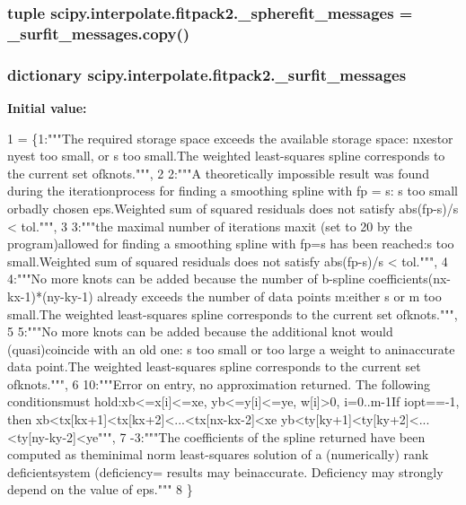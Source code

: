 \subsubsection[{\+\_\+spherefit\+\_\+messages}]{\setlength{\rightskip}{0pt plus 5cm}tuple scipy.\+interpolate.\+fitpack2.\+\_\+spherefit\+\_\+messages = \+\_\+surfit\+\_\+messages.\+copy()}\label{namespacescipy_1_1interpolate_1_1fitpack2_a7b9b6ca290bc4a32d87bcbedf98701c6}
\hypertarget{namespacescipy_1_1interpolate_1_1fitpack2_ab197deef0ee75808b311245ee95464b9}{}
\subsubsection[{\+\_\+surfit\+\_\+messages}]{\setlength{\rightskip}{0pt plus 5cm}dictionary scipy.\+interpolate.\+fitpack2.\+\_\+surfit\+\_\+messages}\label{namespacescipy_1_1interpolate_1_1fitpack2_ab197deef0ee75808b311245ee95464b9}
{\bfseries Initial value\+:}
\begin{DoxyCode}
1 = \{1:\textcolor{stringliteral}{"""The required storage space exceeds the available storage space: nxestor nyest too small, or s too
       small.The weighted least-squares spline corresponds to the current set ofknots."""},
2                     2:\textcolor{stringliteral}{"""A theoretically impossible result was found during the iterationprocess for
       finding a smoothing spline with fp = s: s too small orbadly chosen eps.Weighted sum of squared residuals does not
       satisfy abs(fp-s)/s < tol."""},
3                     3:\textcolor{stringliteral}{"""the maximal number of iterations maxit (set to 20 by the program)allowed for
       finding a smoothing spline with fp=s has been reached:s too small.Weighted sum of squared residuals does not
       satisfy abs(fp-s)/s < tol."""},
4                     4:\textcolor{stringliteral}{"""No more knots can be added because the number of b-spline
       coefficients(nx-kx-1)*(ny-ky-1) already exceeds the number of data points m:either s or m too small.The weighted least-squares
       spline corresponds to the current set ofknots."""},
5                     5:\textcolor{stringliteral}{"""No more knots can be added because the additional knot would (quasi)coincide with
       an old one: s too small or too large a weight to aninaccurate data point.The weighted least-squares spline
       corresponds to the current set ofknots."""},
6                     10:\textcolor{stringliteral}{"""Error on entry, no approximation returned. The following conditionsmust
       hold:xb<=x[i]<=xe, yb<=y[i]<=ye, w[i]>0, i=0..m-1If iopt==-1, then  xb<tx[kx+1]<tx[kx+2]<...<tx[nx-kx-2]<xe 
       yb<ty[ky+1]<ty[ky+2]<...<ty[ny-ky-2]<ye"""},
7                     -3:\textcolor{stringliteral}{"""The coefficients of the spline returned have been computed as theminimal norm
       least-squares solution of a (numerically) rank deficientsystem (deficiency=%
       results may beinaccurate. Deficiency may strongly depend on the value of eps."""}
8                     \}
\end{DoxyCode}
